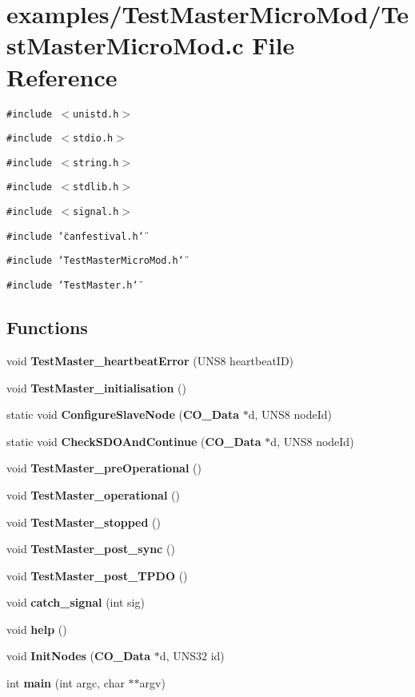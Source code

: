 \section{examples/Test\-Master\-Micro\-Mod/Test\-Master\-Micro\-Mod.c File Reference}
\label{TestMasterMicroMod_8c}
{\tt \#include $<$unistd.h$>$}\par
{\tt \#include $<$stdio.h$>$}\par
{\tt \#include $<$string.h$>$}\par
{\tt \#include $<$stdlib.h$>$}\par
{\tt \#include $<$signal.h$>$}\par
{\tt \#include \char`\"{}canfestival.h\char`\"{}}\par
{\tt \#include \char`\"{}Test\-Master\-Micro\-Mod.h\char`\"{}}\par
{\tt \#include \char`\"{}Test\-Master.h\char`\"{}}\par
\subsection*{Functions}
\begin{CompactItemize}
\item 
void {\bf Test\-Master\_\-heartbeat\-Error} (UNS8 heartbeat\-ID)
\item 
void {\bf Test\-Master\_\-initialisation} ()
\item 
static void {\bf Configure\-Slave\-Node} ({\bf CO\_\-Data} $\ast$d, UNS8 node\-Id)
\item 
static void {\bf Check\-SDOAnd\-Continue} ({\bf CO\_\-Data} $\ast$d, UNS8 node\-Id)
\item 
void {\bf Test\-Master\_\-pre\-Operational} ()
\item 
void {\bf Test\-Master\_\-operational} ()
\item 
void {\bf Test\-Master\_\-stopped} ()
\item 
void {\bf Test\-Master\_\-post\_\-sync} ()
\item 
void {\bf Test\-Master\_\-post\_\-TPDO} ()
\item 
void {\bf catch\_\-signal} (int sig)
\item 
void {\bf help} ()
\item 
void {\bf Init\-Nodes} ({\bf CO\_\-Data} $\ast$d, UNS32 id)
\item 
int {\bf main} (int argc, char $\ast$$\ast$argv)
\end{CompactItemize}
